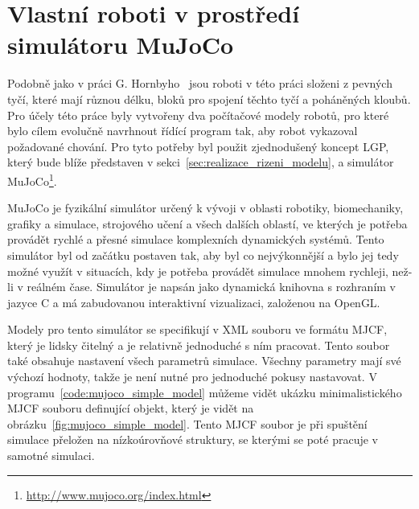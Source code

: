 
\section{Vlastní roboti v prostředí simulátoru MuJoCo}
Podobně jako v práci G. Hornbyho~\cite{Hornby2003} jsou roboti v této práci složeni z pevných tyčí, které mají různou délku, bloků pro spojení těchto tyčí a poháněných kloubů.
Pro účely této práce byly vytvořeny dva počítačové modely robotů, pro které bylo cílem evolučně navrhnout řídící program tak, aby robot vykazoval požadované chování.
Pro tyto potřeby byl použit zjednodušený koncept LGP, který bude blíže představen v sekci~\ref{sec:realizace_rizeni_modelu}, a simulátor MuJoCo\footnote{\url{http://www.mujoco.org/index.html}}.

MuJoCo je fyzikální simulátor určený k vývoji v oblasti robotiky, biomechaniky, grafiky a simulace, strojového učení a všech dalších oblastí, ve kterých je potřeba provádět rychlé a přesné simulace komplexních dynamických systémů.
Tento simulátor byl od začátku postaven tak, aby byl co nejvýkonnější a bylo jej tedy možné využít v situacích, kdy je potřeba provádět simulace mnohem rychleji, než-li v reálném čase.
Simulátor je napsán jako dynamická knihovna s rozhraním v jazyce C a má zabudovanou interaktivní vizualizaci, založenou na OpenGL.

Modely pro tento simulátor se specifikují v XML souboru ve formátu MJCF, který je lidsky čitelný a je relativně jednoduché s ním pracovat.
Tento soubor také obsahuje nastavení všech parametrů simulace.
Všechny parametry mají své výchozí hodnoty, takže je není nutné pro jednoduché pokusy nastavovat.
V programu~\ref{code:mujoco_simple_model} můžeme vidět ukázku minimalistického MJCF souboru definující objekt, který je vidět na obrázku~\ref{fig:mujoco_simple_model}.
Tento MJCF soubor je při spuštění simulace přeložen na nízkoúrovňové struktury, se kterými se poté pracuje v samotné simulaci.

